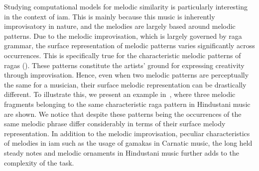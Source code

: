 Studying computational models for melodic similarity is particularly interesting in the context of \gls{iam}. This is mainly because this music is inherently improvisatory in nature, and the melodies are largely based around melodic patterns. Due to the melodic improvisation, which is largely governed by \gls{raga} grammar, the surface representation of melodic patterns varies significantly across occurrences. This is specifically true for the characteristic melodic patterns of \glspl{raga} (). These patterns constitute the artists' ground for expressing creativity through improvisation. Hence, even when two melodic patterns are perceptually the same for a musician, their surface melodic representation can be drastically different. To illustrate this, we present an example in~, where three melodic fragments belonging to the same characteristic \gls{raga} pattern in Hindustani music are shown. We notice that despite these patterns being the occurrences of the same melodic phrase differ considerably in terms of their surface melody representation. In addition to the melodic improvisation, peculiar characteristics of melodies in \gls{iam} such as the usage of \glspl{gamaka} in Carnatic music, the long held steady notes and melodic ornaments in Hindustani music further adds to the complexity of the task.


